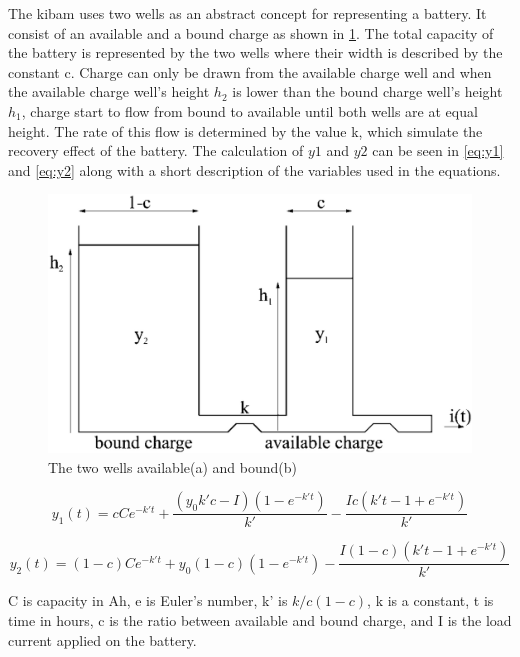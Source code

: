 The \gls{kibam} uses two wells as an abstract concept for representing a battery.
It consist of an available and a bound charge as shown in \cref{fig:kibam_wells}.
The total capacity of the battery is represented by the two wells where their width is described by the constant c.
Charge can only be drawn from the available charge well and when the available charge well's height $h_2$ is lower than the bound charge well's height $h_1$, charge start to flow from bound to available until both wells are at equal height.
The rate of this flow is determined by the value k, which simulate the recovery effect of the battery.
The calculation of $y{1}$ and $y{2}$ can be seen in \cref{eq:y1} and \cref{eq:y2} along with a short description of the variables used in the equations.

\begin{figure}[H]
	\center
	\includegraphics[width=\textwidth/2]{graphics/kibam.jpg}
	\caption{The two wells available(a) and bound(b)}
	\label{fig:kibam_wells}
\end{figure}

\begin{equation}\label{eq:y1}
y_1(t) = cCe^{-k't}+\frac{(y_0k'c-I)(1-e^{-k't})}{k'}-\frac{Ic(k't-1+e^{-k't})}{k'}
\end{equation}

\begin{equation}\label{eq:y2}
y_2(t) = (1-c)Ce^{-k't}+y_0(1-c)(1-e^{-k't})-\frac{I(1-c)(k't-1+e^{-k't})}{k'}
\end{equation}

C is capacity in Ah, e is Euler's number, k' is $k/c(1-c)$, k is a constant, t is time in hours, c is the ratio between available and bound charge, and I is the load current applied on the battery.

